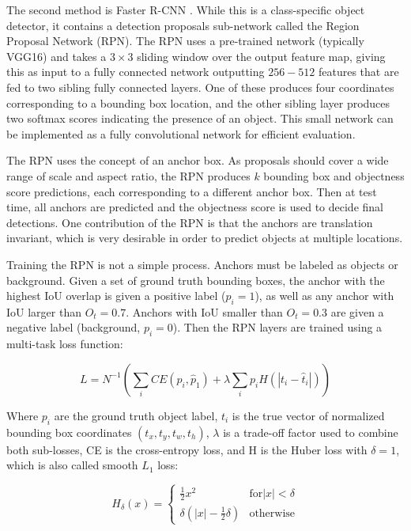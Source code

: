 The second method is Faster R-CNN \cite{ren2015faster}. While this is a class-specific object detector, it contains a detection proposals sub-network called the Region Proposal Network (RPN). The RPN uses a pre-trained network (typically VGG16) and takes a $3 \times 3$ sliding window over the output feature map, giving this as input to a fully connected network outputting $256-512$ features that are fed to two sibling fully connected layers. One of these produces four coordinates corresponding to a bounding box location, and the other sibling layer produces two softmax scores indicating the presence of an object. This small network can be implemented as a fully convolutional network for efficient evaluation.

The RPN uses the concept of an anchor box. As proposals should cover a wide range of scale and aspect ratio, the RPN produces $k$ bounding box and objectness score predictions, each corresponding to a different anchor box. Then at test time, all anchors are predicted and the objectness score is used to decide final detections. One contribution of the RPN is that the anchors are translation invariant, which is very desirable in order to predict objects at multiple locations.

Training the RPN is not a simple process. Anchors must be labeled as objects or background. Given a set of ground truth bounding boxes, the anchor with the highest IoU overlap is given a positive label ($p_i = 1$), as well as any anchor with IoU larger than $O_t = 0.7$. Anchors with IoU smaller than $O_t = 0.3$ are given a negative label (background, $p_i = 0$). Then the RPN layers are trained using a multi-task loss function:

\begin{equation}
	L = N^{-1} \left(\sum_i CE(p_i, \hat{p}_1) + \lambda \sum_i p_i H(|t_i - \hat{t}_i|) \right)
\end{equation}

Where $p_i$ are the ground truth object label, $t_i$ is the true vector of normalized bounding box coordinates $(t_x, t_y, t_w, t_h)$, $\lambda$ is a trade-off factor used to combine both sub-losses, CE is the cross-entropy loss, and H is the Huber loss with $\delta = 1$, which is also called smooth $L_1$ loss:

\begin{equation}
	H_{\delta}(x) =
	\begin{cases}
		\frac{1}{2} x^2 				& \text{for} |x| < \delta\\
		\delta(|x| - \frac{1}{2}\delta) 	& \text{otherwise}
	\end{cases}
\end{equation}

